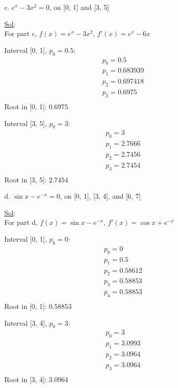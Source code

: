 \begin{enumerate}
\begin{enumerate}
      \item[c.] \( e^x -3x^2 = 0 \), on [0, 1] and [3, 5]

        \underline{Sol}:\\
        For part c, \( f(x) = e^x - 3x^2 \), \( f'(x) = e^x - 6x \)

        Interval [0, 1], \( p_0 = 0.5 \):
        \[
          \begin{array}{l}
            p_0 = 0.5 \\
            p_1 = 0.683939 \\
            p_2 = 0.697418 \\
            p_3 = 0.6975 \\
          \end{array}
        \]
        Root in [0, 1]: \( \boxed{0.6975} \)

        Interval [3, 5], \( p_0 = 3 \):
        \[
          \begin{array}{l}
            p_0 = 3 \\
            p_1 = 2.7666 \\
            p_2 = 2.7456 \\
            p_3 = 2.7454 \\
          \end{array}
        \]
        Root in [3, 5]: \( \boxed{2.7454} \)

      \item[d.] \( \sin x - e^{-x} = 0 \), on [0, 1], [3, 4], and [6, 7]

        \underline{Sol}:\\
        For part d, \( f(x) = \sin x - e^{-x} \), \( f'(x) = \cos x + e^{-x} \)

        Interval [0, 1], \( p_0 = 0 \):
        \[
          \begin{array}{l}
            p_0 = 0 \\
            p_1 = 0.5 \\
            p_2 = 0.58612 \\
            p_3 = 0.58853 \\
            p_4 = 0.58853 \\
          \end{array}
        \]
        Root in [0, 1]: \( \boxed{0.58853} \)

        Interval [3, 4], \( p_0 = 3 \):
        \[
          \begin{array}{l}
            p_0 = 3 \\
            p_1 = 3.0993 \\
            p_2 = 3.0964 \\
            p_3 = 3.0964 \\
          \end{array}
        \]
        Root in [3, 4]: \( \boxed{3.0964} \)


\end{enumerate}
\end{enumerate}
